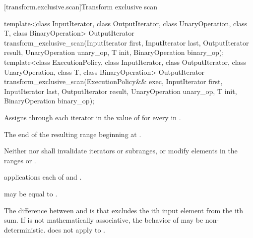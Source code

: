 [transform.exclusive.scan]{Transform exclusive scan}

%
\begin{itemdecl}
template<class InputIterator, class OutputIterator,
         class UnaryOperation,
         class T, class BinaryOperation>
  OutputIterator transform_exclusive_scan(InputIterator first, InputIterator last,
                                          OutputIterator result,
                                          UnaryOperation unary_op,
                                          T init, BinaryOperation binary_op);
template<class ExecutionPolicy, class InputIterator, class OutputIterator,
         class UnaryOperation,
         class T, class BinaryOperation>
  OutputIterator transform_exclusive_scan(ExecutionPolicy&& exec,
                                          InputIterator first, InputIterator last,
                                          OutputIterator result,
                                          UnaryOperation unary_op,
                                          T init, BinaryOperation binary_op);
\end{itemdecl}

\begin{itemdescr}
\pnum
\effects
Assigns through each iterator  in  the value of
for every  in .

\pnum
\returns
The end of the resulting range beginning at .

\pnum
\requires
Neither  nor  shall invalidate iterators or
subranges, or modify elements in the ranges
 or
.

\pnum
\complexity
{} applications each of  and
.

\pnum
\remarks
{} may be equal to .

\pnum
\realnotes
The difference between  and
 is that 
excludes the ith input element from the ith sum. If  is not
mathematically associative, the behavior of 
may be non-deterministic.  does not apply
 to .
\end{itemdescr}


